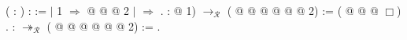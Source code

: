 \documentclass[notheorems]{beamer}
\theoremstyle{definition}
\begin{document}
{\begin{coqdoccode}
\coqdocemptyline
\coqdocemptyline
\coqdocemptyline
\coqdocnoindent
{}
( : ) :
 :=
  \coqdoceol
\coqdocindent{1.00em}
\ensuremath{|} 1 \ensuremath{\Rightarrow}
 @
 @
 @
 2\coqdoceol
\coqdocindent{1.00em}
\ensuremath{|} \coqdocvar{\_} \ensuremath{\Rightarrow}
\coqdoceol
\coqdocindent{1.00em}
.\coqdoceol
\coqdocemptyline
\coqdocnoindent
{}
:  @
 1) $\rightarrow_\mathcal{R}$
( @
 @
 @
 @
 @
\coqdoceol
\coqdocindent{1.00em} @
 2) :=
( @
 @
 @
$\Box$)
\coqdoclemma{\_}
\coqdoclemma{\_}
\coqdoclemma{\_}.\coqdoceol
\coqdocemptyline
\coqdocnoindent
{}
: \coqdocdefinition{$\psi$} $\twoheadrightarrow_\mathcal{R}$
( @
 @
 @
 @
 @
 @
 2) :=\coqdoceol
\coqdocindent{1.00em}
.\coqdoceol
\end{coqdoccode}

}
\end{document}
